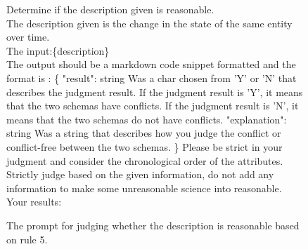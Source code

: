 \begin{figure}[htbp]
\centering
\begin{tcolorbox}
Determine if the description given is reasonable.
\\
The description given is the change in the state of the same entity over time.\\
The input:\{description\}\\
The output should be a markdown code snippet formatted and the format is : 
\{
        "result": string  Was a char chosen from 'Y' or 'N' that describes the judgment result. If the judgment result is 'Y', it means that the two schemas have conflicts. If the judgment result is 'N', it means that the two schemas do not have conflicts.
        "explanation": string Was a string that describes how you judge the conflict or conflict-free between the two schemas.
\}
Please be strict in your judgment and consider the chronological order of the attributes.\\
Strictly judge based on the given information, do not add any information to make some unreasonable science into reasonable.\\
Your results:\\
\end{tcolorbox}
\caption{The prompt for judging whether the description is reasonable based on rule 5.}
\label{tab:judge5}
\end{figure}



